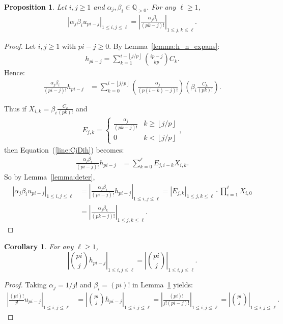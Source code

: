 \documentclass[letterpaper,oneside, 10pt]{amsart}
\newtheorem{corollary}[thm]{Corollary}
\newtheorem{prop}[thm]{Proposition}
\theoremstyle{definition}
\numberwithin{equation}{section}
\newcommand{\floor}[1]{\left \lfloor #1 \right \rfloor}
\begin{document}
\begin{prop}\label{prop:CD_det}
Let $i,j\geq 1$ and $\alpha_j,\beta_i\in\mathbb{Q}_{>0}$. For any $\ell\geq 1$,
\begin{align*}
	|\alpha_j\beta_iu_{pi-j}|_{1\leq i,j\leq \ell} =  |\frac{\alpha_j\beta_i}{(pk-j)!}|_{1\leq j,k\leq \ell}.
\end{align*}
\end{prop}
\begin{proof}
Let $i,j\geq 1$ with $pi-j\geq 0$. By Lemma~\ref{lemma:h_n_expans}:
\begin{align*}
	h_{pi-j} = \sum_{k=1}^{i-\floor{j/p}}\binom{ip-j}{kp} C_k.
\end{align*}
Hence:
\begin{align}\label{line:CjDih}
	\frac{\alpha_j\beta_i}{(pi-j)!}h_{pi-j} &= \sum_{k=0}^{i-\floor{j/p}}\left (\frac{\alpha_j}{(p(i-k)-j)!}\right )\left (\beta_i\frac{C_k}{(pk)!}\right).
\end{align}

Thus if $X_{i,k} = \beta_i\frac{C_k}{(pk)!}$ and
\begin{align*}
E_{j, k} = \begin{cases}
		\frac{\alpha_j}{(pk-j)!} & k\geq  \floor{j/p}\\
		0 & k< \floor{j/p}
		\end{cases},
\end{align*} 
then Equation~(\ref{line:CjDih}) becomes:
\begin{align}
\frac{\alpha_j\beta_i}{(pi-j)!}h_{pi-j} &= \sum_{k=0}^{\ell}E_{j,i-k}X_{i,k}.
\end{align}
So by Lemma~\ref{lemma:deter},
\begin{align*}
	|\alpha_j\beta_iu_{pi-j}|_{1\leq i,j\leq \ell} &=|\frac{\alpha_j\beta_i}{(pi-j)!}h_{pi-j}|_{1\leq i,j\leq \ell} =  |E_{j,k}|_{1\leq j,k\leq \ell} \cdot \prod_{i=1}^\ell X_{i,0} \\
	&=  |\frac{\alpha_j\beta_k}{(pk-j)!}|_{1\leq j,k\leq \ell}.
\end{align*}
\end{proof}

\begin{corollary}\label{corr:binom}
For any $\ell\geq 1$,
\[
	|\binom{pi}{j}h_{pi-j}|_{1\leq i,j\leq \ell} = |\binom{pi}{j}|_{1\leq i,j\leq \ell}.
\]
\end{corollary}
\begin{proof}
Taking $\alpha_j=1/j!$ and $\beta_i = (pi)!$ in Lemma~\ref{prop:CD_det} yields:
\begin{align*}
	|\frac{(pi)!}{j!}u_{pi-j}|_{1\leq i,j\leq \ell} &= 
	|\binom{pi}{j}h_{pi-j}|_{1\leq i,j\leq \ell} =  |\frac{(pi)!}{j!(pi-j)!}|_{1\leq i,j\leq \ell} = |\binom{pi}{j}|_{1\leq i,j\leq \ell}.
\end{align*}
\end{proof}
\end{document}
